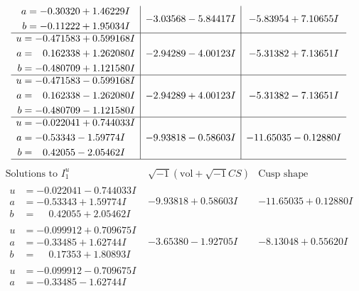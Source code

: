 \documentclass[1p]{elsarticle_modified}
\theoremstyle{definition}
\newcommand{\I}{\sqrt{-1}}
\begin{document}
$$\begin{array}{c|c|c}
\begin{aligned}
a &= -0.30320 + 1.46229 I \\
b &= -0.11222 + 1.95034 I\end{aligned}
 & -3.03568 - 5.84417 I & -5.83954 + 7.10655 I \\ \hline\begin{aligned}
u &= -0.471583 + 0.599168 I \\
a &= \phantom{-}0.162338 + 1.262080 I \\
b &= -0.480709 + 1.121580 I\end{aligned}
 & -2.94289 - 4.00123 I & -5.31382 + 7.13651 I \\ \hline\begin{aligned}
u &= -0.471583 - 0.599168 I \\
a &= \phantom{-}0.162338 - 1.262080 I \\
b &= -0.480709 - 1.121580 I\end{aligned}
 & -2.94289 + 4.00123 I & -5.31382 - 7.13651 I \\ \hline\begin{aligned}
u &= -0.022041 + 0.744033 I \\
a &= -0.53343 - 1.59774 I \\
b &= \phantom{-}0.42055 - 2.05462 I\end{aligned}
 & -9.93818 - 0.58603 I & -11.65035 - 0.12880 I\\
 \hline 
 \end{array}$$\newpage$$\begin{array}{c|c|c}  
\text{Solutions to }I^u_{1}& \I (\text{vol} + \sqrt{-1}CS) & \text{Cusp shape}\\
 \hline 
\begin{aligned}
u &= -0.022041 - 0.744033 I \\
a &= -0.53343 + 1.59774 I \\
b &= \phantom{-}0.42055 + 2.05462 I\end{aligned}
 & -9.93818 + 0.58603 I & -11.65035 + 0.12880 I \\ \hline\begin{aligned}
u &= -0.099912 + 0.709675 I \\
a &= -0.33485 + 1.62744 I \\
b &= \phantom{-}0.17353 + 1.80893 I\end{aligned}
 & -3.65380 - 1.92705 I & -8.13048 + 0.55620 I \\ \hline\begin{aligned}
u &= -0.099912 - 0.709675 I \\
a &= -0.33485 - 1.62744 I \\

\end{aligned}
\end{array}$$
\end{document}
